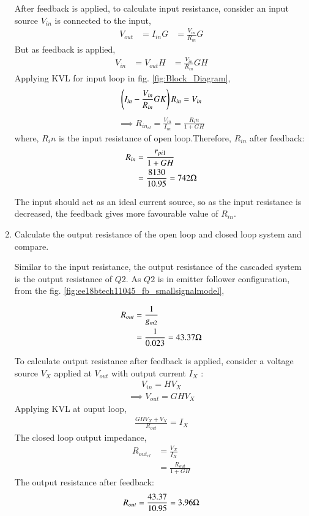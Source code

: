 \begin{enumerate}[label=\arabic*.,ref=\theenumi]
After feedback is applied, to calculate input resistance, consider an input source $V_{in}$ is connected to the input,
\begin{align}
    V_{out} &= I_{in}G
    &= \frac{V_{in}}{R_{in}}G
\end{align}
But as feedback is applied,
\begin{align}
    V_{in} &= V_{out} H
    &= \frac{V_{in}}{R_{in}}GH
\end{align}
Applying KVL for input loop in fig. \ref{fig:Block_Diagram},
\begin{align}
    \left(I_{in} - \frac{V_{in}}{R_{in}}GK\right)R_{in} = V_{in}
\end{align}
\begin{align}
    \implies R_{in_{cl}} = \frac{V_{in}}{I_{in}} = \frac{R_in}{1+GH}
\end{align}
where, $R_in$ is the input resistance of open loop.Therefore, $R_{in}$ after feedback:
\begin{align}
    R_{in} &= \frac{r_{pi1}}{1 + GH}
    \\
    &= \frac{8130}{10.95} = 742 \ohm
\end{align}

The input should act as an ideal current source, so as the input resistance is decreased, the feedback gives more favourable value of $R_{in}$.

\item Calculate the output resistance of the open loop and closed loop system and compare.

\solution

Similar to the input resistance, the output resistance of the cascaded system is the output resistance of $Q2$. As $Q2$ is in emitter follower configuration, from the fig. \ref{fig:ee18btech11045_fb_smallsignalmodel},

\begin{align}
    R_{out} &= \frac{1}{g_{m2}}
    \\
    &= \frac{1}{0.023} = 43.37 \ohm
\end{align}

To calculate output resistance after feedback is applied, consider a voltage source $V_X$ applied at $V_{out}$ with output current $I_X$ :
\begin{align}
    V_{in} = HV_{X}
\end{align}
\begin{align}
    \implies V_{out} = GHV_{X}
\end{align}
Applying KVL at ouput loop,
\begin{align}
    \frac{GHV_X+V_X}{R_{out}} = I_X
\end{align}
The closed loop output impedance,
\begin{align}
    R_{out_{cl}} &= \frac{V_X}{I_X}
    \\
    &= \frac{R_{out}}{1 + GH}
\end{align}
The output resistance after feedback:
\begin{align}
    R_{out} = \frac{43.37}{10.95} = 3.96 \ohm
\end{align}


\end{enumerate}
